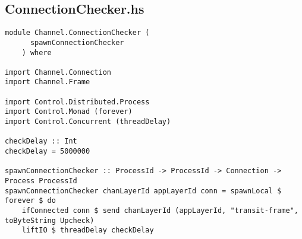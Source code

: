 \documentclass[russian,utf8,simple,emptystyle]{eskdtext}
\begin{document}
\subsection{ConnectionChecker.hs}
\begin{lstlisting}
module Channel.ConnectionChecker (
      spawnConnectionChecker
    ) where

import Channel.Connection 
import Channel.Frame

import Control.Distributed.Process
import Control.Monad (forever)
import Control.Concurrent (threadDelay)

checkDelay :: Int
checkDelay = 5000000

spawnConnectionChecker :: ProcessId -> ProcessId -> Connection -> Process ProcessId
spawnConnectionChecker chanLayerId appLayerId conn = spawnLocal $ forever $ do
    ifConnected conn $ send chanLayerId (appLayerId, "transit-frame", toByteString Upcheck)
    liftIO $ threadDelay checkDelay
\end{lstlisting}
\end{document}
